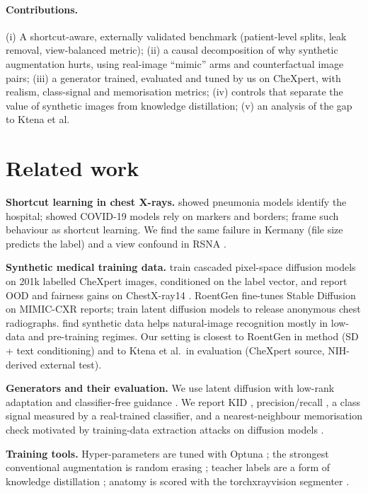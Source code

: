 \documentclass[11pt,a4paper]{article}
\begin{document}
\paragraph{Contributions.} (i) A shortcut-aware, externally validated benchmark (patient-level splits, leak removal, view-balanced metric); (ii) a causal decomposition of why synthetic augmentation hurts, using real-image ``mimic'' arms and counterfactual image pairs; (iii) a generator trained, evaluated and tuned by us on CheXpert, with realism, class-signal and memorisation metrics; (iv) controls that separate the value of synthetic images from knowledge distillation; (v) an analysis of the gap to Ktena et al.

\section{Related work}
\label{sec:related}
\textbf{Shortcut learning in chest X-rays.} \citet{zech2018} showed pneumonia models identify the hospital; \citet{degrave2021} showed COVID-19 models rely on markers and borders; \citet{geirhos2020} frame such behaviour as shortcut learning. We find the same failure in Kermany \citep{kermany2018} (file size predicts the label) and a view confound in RSNA \citep{shih2019}.

\textbf{Synthetic medical training data.} \citet{ktena2024} train cascaded pixel-space diffusion models on 201k labelled CheXpert images, conditioned on the label vector, and report OOD and fairness gains on ChestX-ray14 \citep{wang2017}. RoentGen \citep{chambon2022} fine-tunes Stable Diffusion on MIMIC-CXR reports; \citet{packhauser2023} train latent diffusion models to release anonymous chest radiographs. \citet{he2023} find synthetic data helps natural-image recognition mostly in low-data and pre-training regimes. Our setting is closest to RoentGen in method (SD + text conditioning) and to Ktena et al.\ in evaluation (CheXpert source, NIH-derived external test).

\textbf{Generators and their evaluation.} We use latent diffusion \citep{rombach2022} with low-rank adaptation \citep{hu2022} and classifier-free guidance \citep{ho2021}. We report KID \citep{binkowski2018}, precision/recall \citep{kynkaanniemi2019}, a class signal measured by a real-trained classifier, and a nearest-neighbour memorisation check motivated by training-data extraction attacks on diffusion models \citep{carlini2023}.

\textbf{Training tools.} Hyper-parameters are tuned with Optuna \citep{akiba2019}; the strongest conventional augmentation is random erasing \citep{zhong2020}; teacher labels are a form of knowledge distillation \citep{hinton2015}; anatomy is scored with the torchxrayvision segmenter \citep{cohen2022}.
\end{document}
